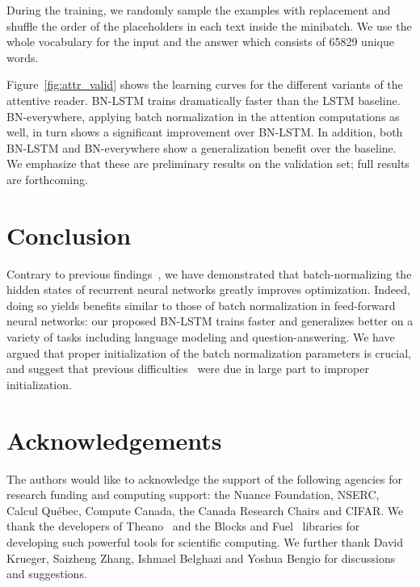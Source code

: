 \documentclass{article} %
\begin{document}
During the training, we randomly sample the examples with replacement and shuffle the order of the placeholders in each text inside the minibatch. We use the whole vocabulary for the input and the answer which consists of 65829 unique words.

Figure~\ref{fig:attr_valid} shows the learning curves for the different variants of the attentive reader.
BN-LSTM trains dramatically faster than the LSTM baseline.
BN-everywhere, applying batch normalization in the attention computations as well, in turn shows a significant
improvement over BN-LSTM.
In addition, both BN-LSTM and BN-everywhere show a generalization benefit over the baseline.
We emphasize that these are preliminary results on the validation set; full results are forthcoming.

\section{Conclusion}

Contrary to previous findings~\cite{cesar,baidu},
we have demonstrated that batch-normalizing the hidden states of recurrent neural networks greatly improves optimization.
Indeed, doing so yields benefits similar to those of batch normalization in feed-forward neural networks:
our proposed BN-LSTM trains faster and generalizes better on a variety of tasks including language modeling and question-answering.
We have argued that proper initialization of the batch normalization parameters is crucial,
and suggest that previous difficulties~\cite{cesar, baidu} were due in large part to improper initialization.

\section*{Acknowledgements}

The authors would like to acknowledge the support of the following agencies for
research funding and computing support: the Nuance Foundation, NSERC, Calcul Qu\'{e}bec, Compute Canada,
the Canada Research Chairs and CIFAR.
We thank the developers of Theano~\cite{theano2} and the
Blocks and Fuel~\cite{blocks} libraries for developing such powerful tools for scientific computing.
We further thank David Krueger, Saizheng Zhang, Ishmael Belghazi and Yoshua Bengio for discussions and suggestions.



\end{document}
